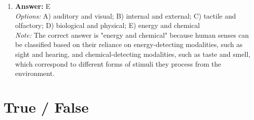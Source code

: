 \documentclass[12pt]{article}
\begin{document}
\begin{enumerate}[label=\arabic*.]
\item \textbf{Answer:} E
\\ \textit{Options:} A) auditory and visual; B) internal and external; C) tactile and olfactory; D) biological and physical; E) energy and chemical
\\ \textit{Note:} The correct answer is "energy and chemical" because human senses can be classified based on their reliance on energy-detecting modalities, such as sight and hearing, and chemical-detecting modalities, such as taste and smell, which correspond to different forms of stimuli they process from the environment.
\end{enumerate}

\section*{True / False}
\end{document}
